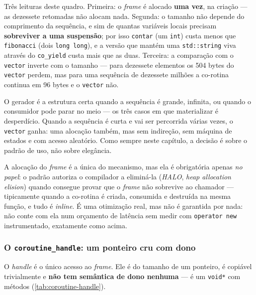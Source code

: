 Três leituras deste quadro. Primeira: o \emph{frame} é alocado \textbf{uma vez},
na criação --- as dezessete retomadas não alocam nada. Segunda: o tamanho não
depende do comprimento da sequência, e sim de quantas variáveis locais precisam
\textbf{sobreviver a uma suspensão}; por isso \texttt{contar} (um \texttt{int})
custa menos que \texttt{fibonacci} (dois \texttt{long long}), e a versão que
mantém uma \texttt{std::string} viva através do \texttt{co\_yield} custa mais
que as duas. Terceira: a comparação com o \texttt{vector} inverte com o
tamanho --- para dezessete elementos os 504 bytes do \texttt{vector} perdem,
mas para uma sequência de dezessete milhões a co-rotina continua em 96 bytes e o
\texttt{vector} não.

\begin{regra}
O gerador é a estrutura certa quando a sequência é grande, infinita, ou quando
o consumidor pode parar no meio --- os três casos em que materializar é
desperdício. Quando a sequência é curta e vai ser percorrida várias vezes, o
\texttt{vector} ganha: uma alocação também, mas sem indireção, sem máquina de
estados e com acesso aleatório. Como sempre neste capítulo, a decisão é sobre o
padrão de uso, não sobre elegância.
\end{regra}

\begin{aviso}
A alocação do \emph{frame} é a única do mecanismo, mas ela é obrigatória
apenas \emph{no papel}: o padrão autoriza o compilador a eliminá-la
(\emph{HALO}, \emph{heap allocation elision}) quando consegue provar que o
\emph{frame} não sobrevive ao chamador --- tipicamente quando a co-rotina é
criada, consumida e destruída na mesma função, e tudo é \emph{inline}. É uma
otimização real, mas não é garantida por nada: não conte com ela num orçamento
de latência sem medir com \texttt{operator new} instrumentado, exatamente como
acima.
\end{aviso}

\subsubsection{O \texttt{coroutine\_handle}: um ponteiro cru com dono}

O \emph{handle} é o único acesso ao \emph{frame}. Ele é do tamanho de um
ponteiro, é copiável trivialmente e \textbf{não tem semântica de dono nenhuma}
--- é um \texttt{void*} com métodos (\cref{tab:coroutine-handle}).

